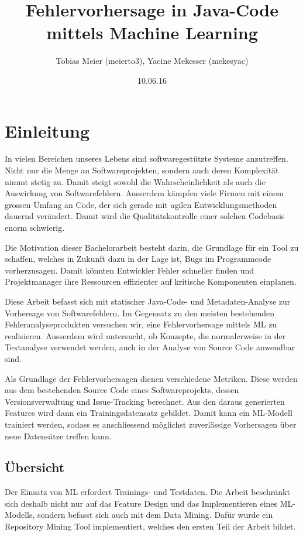 \documentclass[10pt, a4paper]{article}
\title{Fehlervorhersage in Java-Code mittels Machine Learning}
\author{Tobias Meier (meierto3), Yacine Mekesser (mekesyac)}
\date{10.06.16}
\begin{document}
	

\tableofcontents
\pagebreak

\section{Einleitung}

In vielen Bereichen unseres Lebens sind softwaregestützte Systeme anzutreffen. Nicht nur die Menge an Softwareprojekten, sondern auch deren Komplexität nimmt stetig zu. Damit steigt sowohl die Wahrscheinlichkeit als auch die Auswirkung von Softwarefehlern. Ausserdem kämpfen viele Firmen mit einem grossen Umfang an Code, der sich gerade mit agilen Entwicklungsmethoden dauernd verändert. Damit wird die Qualitätskontrolle einer solchen Codebasis enorm schwierig.

Die Motivation dieser Bachelorarbeit besteht darin, die Grundlage für ein Tool zu schaffen, welches in Zukunft dazu in der Lage ist, Bugs im Programmcode vorherzusagen. Damit könnten Entwickler Fehler schneller finden und Projektmanager ihre Ressourcen effizienter auf kritische Komponenten einplanen.

Diese Arbeit befasst sich mit statischer Java-Code- und Metadaten-Analyse zur Vorhersage von Softwarefehlern. Im Gegensatz zu den meisten bestehenden Fehleranalyseprodukten versuchen wir, eine Fehlervorhersage mittels  \ac{ML} zu realisieren. Ausserdem wird untersucht, ob Konzepte, die normalerweise in der Textanalyse verwendet werden, auch in der Analyse von Source Code anwendbar sind.

Als Grundlage der Fehlervorhersagen dienen verschiedene Metriken. Diese werden aus dem bestehenden Source Code eines Softwareprojekts, dessen Versionsverwaltung und Issue-Tracking berechnet. Aus den daraus generierten Features wird dann ein Trainingsdatensatz gebildet. Damit kann ein \ac{ML}-Modell trainiert werden, sodass es anschliessend möglichst zuverlässige Vorhersagen über neue Datensätze treffen kann.

\subsection{Übersicht}
Der Einsatz von \ac{ML} erfordert Trainings- und Testdaten. Die Arbeit beschränkt sich deshalb nicht nur auf das Feature Design und das Implementieren eines \ac{ML}-Modells, sondern befasst sich auch mit dem Data Mining. Dafür wurde ein Repository Mining Tool implementiert, welches den ersten Teil der Arbeit bildet.
\end{document}
